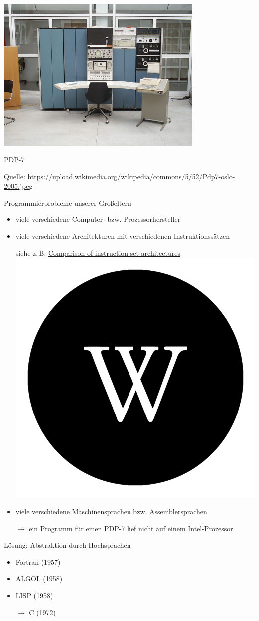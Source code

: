 \documentclass[
  aspectratio=1610,
]{beamer}
\newcommand{\wplogo}{\includegraphics[height=2ex]{enwiki.png}}
\begin{document}
\begin{frame}
  \begin{center}
    \includegraphics[width=0.75\textwidth]{Pdp7-oslo-2005.jpeg}

    PDP-7
  \end{center}
  \tiny Quelle:
  \url{https://upload.wikimedia.org/wikipedia/commons/5/52/Pdp7-oslo-2005.jpeg}
\end{frame}

\begin{frame}{Programmierprobleme unserer Großeltern}
  \begin{itemize}
    \item viele verschiedene Computer- bzw. Prozessorhersteller
    \item viele verschiedene Architekturen mit verschiedenen Instruktionssätzen

      siehe z.\,B.
      \href{https://en.wikipedia.org/wiki/Comparison_of_instruction_set_architectures}{Comparison
      of instruction set architectures \wplogo}
    \item viele verschiedene Maschinensprachen bzw. Assemblersprachen
    \item[$\rightarrow$] ein Programm für einen PDP-7 lief nicht auf einem Intel-Prozessor
  \end{itemize}

  \pause{}
  \vspace{1em}

  Lösung: Abstraktion durch Hochsprachen

  \begin{itemize}
    \item Fortran (1957)
    \item ALGOL (1958)
    \item LISP (1958)
    \item[$\rightarrow$] C (1972)
  \end{itemize}
\end{frame}
\end{document}
